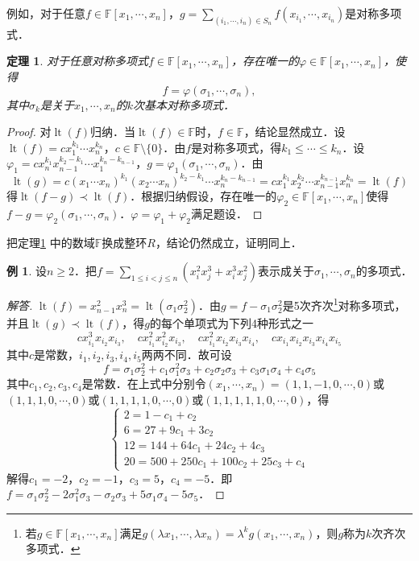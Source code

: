 \documentclass[a4paper,fontset=windows]{ctexbook}
\newtheorem{theorem}{定理}[chapter]
\theoremstyle{definition}
\newtheorem{example}{例}[chapter]
\DeclareMathOperator{\lt}{lt}
\def\note{\noindent\raisebox{10pt}{\dbend}\hspace{7pt}}
\renewcommand{\le}{\leqslant}
\renewcommand{\ge}{\geqslant}
\begin{document}
例如，对于任意$f\in\mathbb{F}[x_1,\cdots,x_n]$，$g=\sum\limits_{(i_1,\cdots,i_n)\in S_n}f(x_{i_1},\cdots,x_{i_n})$是对称多项式．

\begin{theorem}\label{thm11.20}
对于任意对称多项式$f\in\mathbb{F}[x_1,\cdots,x_n]$，存在唯一的$\varphi\in\mathbb{F}[x_1,\cdots,x_n]$，使得
$$f=\varphi(\sigma_1,\cdots,\sigma_n),$$
其中$\sigma_k$是关于$x_1,\cdots,x_n$的$k$次基本对称多项式．
\end{theorem}

\begin{proof}
对$\lt(f)$归纳．当$\lt(f)\in\mathbb{F}$时，$f\in\mathbb{F}$，结论显然成立．设$\lt(f)=c x_1^{k_1}\cdots x_n^{k_n}$，$c\in\mathbb{F}\setminus\{0\}$．由$f$是对称多项式，得$k_1\le\cdots\le k_n$．设$\varphi_1=cx_n^{k_1}x_{n-1}^{k_2-k_1}\cdots x_1^{k_n-k_{n-1}}$，$g=\varphi_1(\sigma_1,\cdots,\sigma_n)$．由
$$\lt(g)=c(x_1\cdots x_n)^{k_1}(x_2\cdots x_n)^{k_2-k_1}\cdots x_n^{k_n-k_{n-1}}=cx_1^{k_1}x_2^{k_2}\cdots x_{n-1}^{k_{n-1}}x_n^{k_n}=\lt(f)$$
得$\lt(f-g)\prec\lt(f)$．根据归纳假设，存在唯一的$\varphi_2\in\mathbb{F}[x_1,\cdots,x_n]$使得$f-g=\varphi_2(\sigma_1,\cdots,\sigma_n)$．$\varphi=\varphi_1+\varphi_2$满足题设．
\end{proof}

\note 把定理\ref{thm11.20} 中的数域$\mathbb{F}$换成整环$R$，结论仍然成立，证明同上．

\begin{example}
设$n\ge 2$．把$f=\sum\limits_{1\le i<j\le n}(x_i^2x_j^3+x_i^3x_j^2)$表示成关于$\sigma_1,\cdots,\sigma_n$的多项式．
\end{example}

\begin{proof}[解答]
$\lt(f)=x_{n-1}^2x_n^3=\lt(\sigma_1\sigma_2^2)$．由$g=f-\sigma_1\sigma_2^2$是5次齐次\footnote{若$g\in\mathbb{F}[x_1,\cdots,x_n]$满足$g(\lambda x_1,\cdots,\lambda x_n)=\lambda^kg(x_1,\cdots,x_n)$，则$g$称为$k$次齐次多项式．}对称多项式，并且$\lt(g)\prec\lt(f)$，得$g$的每个单项式为下列4种形式之一
$$cx_{i_1}^3x_{i_2}x_{i_3},\quad cx_{i_1}^2x_{i_2}^2x_{i_3},\quad cx_{i_1}^2x_{i_2}x_{i_3}x_{i_4},\quad cx_{i_1}x_{i_2}x_{i_3}x_{i_4}x_{i_5}$$
其中$c$是常数，$i_1,i_2,i_3,i_4,i_5$两两不同．故可设
$$f=\sigma_1\sigma_2^2+c_1\sigma_1^2\sigma_3+c_2\sigma_2\sigma_3 +c_3\sigma_1\sigma_4+c_4\sigma_5$$
其中$c_1,c_2,c_3,c_4$是常数．在上式中分别令$(x_1,\cdots,x_n)=(1,1,-1,0,\cdots,0)$或$(1,1,1,0,\cdots,0)$或$(1,1,1,1,0,\cdots,0)$或$(1,1,1,1,1,0,\cdots,0)$，得
$$\begin{cases}2=1-c_1+c_2 \\ 6=27+9c_1+3c_2 \\ 12=144+64c_1+24c_2+4c_3 \\ 20=500+250c_1+100c_2+25c_3+c_4
\end{cases}$$
解得$c_1=-2$，$c_2=-1$，$c_3=5$，$c_4=-5$．即$f=\sigma_1\sigma_2^2-2\sigma_1^2\sigma_3-\sigma_2\sigma_3+5\sigma_1\sigma_4-5\sigma_5$．
\end{proof}
\end{document}
